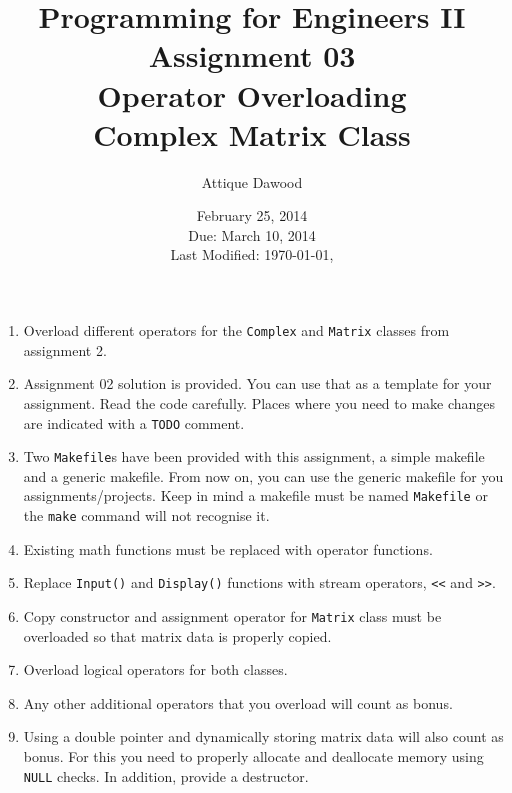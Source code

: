 \documentclass[12pt,a4paper]{article}
\title{\vspace{-3cm}Programming for Engineers II\\Assignment 03\\Operator Overloading\\Complex Matrix Class}
\author{Attique Dawood}
\date{February 25, 2014\\Due: March 10, 2014\\[0.2cm] Last Modified: \today, \currenttime}
\begin{document}
\maketitle
\begin{enumerate}
\item Overload different operators for the \verb|Complex| and \verb|Matrix| classes from assignment 2.
\item Assignment 02 solution is provided. You can use that as a template for your assignment. Read the code carefully. Places where you need to make changes are indicated with a \verb|TODO| comment.
\item Two \verb|Makefile|s have been provided with this assignment, a simple makefile and a generic makefile. From now on, you can use the generic makefile for you assignments/projects. Keep in mind a makefile must be named \verb|Makefile| or the \verb|make| command will not recognise it.
\item Existing math functions must be replaced with operator functions.
\item Replace \verb|Input()| and \verb|Display()| functions with stream operators, \verb|<<| and \verb|>>|.
\item Copy constructor and assignment operator for \verb|Matrix| class must be overloaded so that matrix data is properly copied.
\item Overload logical operators for both classes.
\item Any other additional operators that you overload will count as bonus.
\item Using a double pointer and dynamically storing matrix data will also count as bonus. For this you  need to properly allocate and deallocate memory using \verb|NULL| checks. In addition, provide a destructor.
\end{enumerate}
\end{document}
